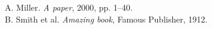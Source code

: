 \documentclass{mathcryptology} %
\begin{document}


\begin{thebibliography}{}
        A. Miller. \emph{A paper}, 2000, pp. 1--40.\\[-20pt]
        B. Smith et al. \emph{Amazing book}, Famous Publisher, 1912.\\[-20pt]
\end{thebibliography}

\end{document}
